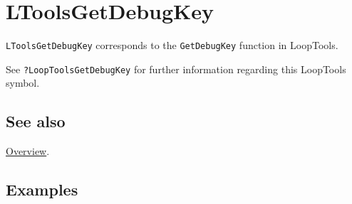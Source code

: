 \documentclass[../FeynHelpersManual.tex]{subfiles}
\begin{document}
\hypertarget{ltoolsgetdebugkey}{
\section{LToolsGetDebugKey}\label{ltoolsgetdebugkey}}

\texttt{LToolsGetDebugKey} corresponds to the \texttt{GetDebugKey}
function in LoopTools.

See \texttt{?LoopTools\textasciigrave GetDebugKey} for further
information regarding this LoopTools symbol.

\subsection{See also}

\hyperlink{toc}{Overview}.

\subsection{Examples}
\end{document}
